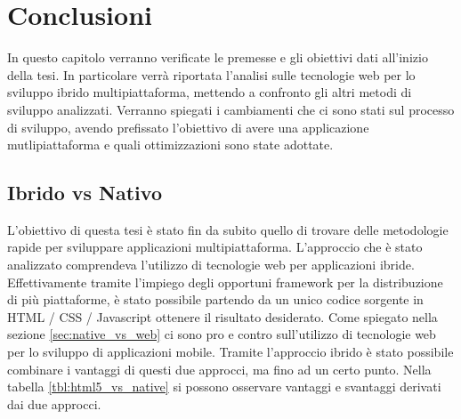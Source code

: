 \chapter{Conclusioni}
In questo capitolo verranno verificate le premesse e gli obiettivi dati all'inizio della tesi. In particolare verrà riportata l'analisi sulle tecnologie web per lo sviluppo ibrido multipiattaforma, mettendo a confronto gli altri metodi di sviluppo analizzati.
Verranno spiegati i cambiamenti che ci sono stati sul processo di sviluppo, avendo prefissato l'obiettivo di avere una applicazione mutlipiattaforma e quali ottimizzazioni sono state adottate. 

\section{Ibrido vs Nativo}
L'obiettivo di questa tesi è stato fin da subito quello di trovare delle metodologie rapide per sviluppare applicazioni multipiattaforma. L'approccio che è stato analizzato comprendeva l'utilizzo di tecnologie web per applicazioni ibride.
Effettivamente tramite l'impiego degli opportuni framework per la distribuzione di più piattaforme, è stato possibile partendo da un unico codice sorgente in HTML / CSS / Javascript ottenere il risultato desiderato.
Come spiegato nella sezione \ref{sec:native_vs_web} ci sono pro e contro sull'utilizzo di tecnologie web per lo sviluppo di applicazioni mobile. Tramite l'approccio ibrido è stato possibile combinare i vantaggi di questi due approcci, ma fino ad un certo punto. Nella tabella \ref{tbl:html5_vs_native} si possono osservare vantaggi e svantaggi derivati dai due approcci.

